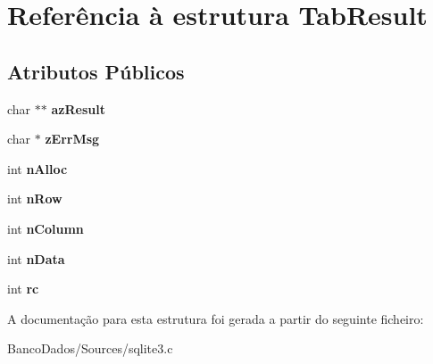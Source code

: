 \hypertarget{struct_tab_result}{\section{Referência à estrutura Tab\-Result}
\label{struct_tab_result}
}
\subsection*{Atributos Públicos}
\begin{DoxyCompactItemize}
\item 
\hypertarget{struct_tab_result_a7446a22a7b39c17e447c65ba200490a6}{char $\ast$$\ast$ {\bfseries az\-Result}}\label{struct_tab_result_a7446a22a7b39c17e447c65ba200490a6}

\item 
\hypertarget{struct_tab_result_a6e7104bb622be05f16b6470dbb68a6c7}{char $\ast$ {\bfseries z\-Err\-Msg}}\label{struct_tab_result_a6e7104bb622be05f16b6470dbb68a6c7}

\item 
\hypertarget{struct_tab_result_a6a1d5bc64a1eeef54b56cb2602b663b2}{int {\bfseries n\-Alloc}}\label{struct_tab_result_a6a1d5bc64a1eeef54b56cb2602b663b2}

\item 
\hypertarget{struct_tab_result_ae803d6f07364c9e03bee8abd13056e1b}{int {\bfseries n\-Row}}\label{struct_tab_result_ae803d6f07364c9e03bee8abd13056e1b}

\item 
\hypertarget{struct_tab_result_a44237b9ab33cdbca7a5a158470ebcaa3}{int {\bfseries n\-Column}}\label{struct_tab_result_a44237b9ab33cdbca7a5a158470ebcaa3}

\item 
\hypertarget{struct_tab_result_a959e8dd3348f76e4cdabad9c89ee62d1}{int {\bfseries n\-Data}}\label{struct_tab_result_a959e8dd3348f76e4cdabad9c89ee62d1}

\item 
\hypertarget{struct_tab_result_a44bb015ce660ed3f987e324919d73f4d}{int {\bfseries rc}}\label{struct_tab_result_a44bb015ce660ed3f987e324919d73f4d}

\end{DoxyCompactItemize}


A documentação para esta estrutura foi gerada a partir do seguinte ficheiro\-:\begin{DoxyCompactItemize}
\item 
Banco\-Dados/\-Sources/sqlite3.\-c\end{DoxyCompactItemize}
